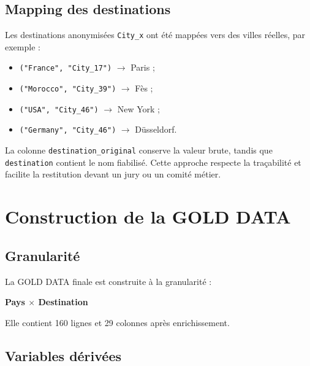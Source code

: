 \documentclass[11pt,a4paper]{report}
\begin{document}
\section{Mapping des destinations}

Les destinations anonymisées \texttt{City\_x} ont été mappées vers des villes réelles, par exemple :

\begin{itemize}[leftmargin=*]
    \item \texttt{("France", "City\_17")} $\rightarrow$ Paris ;
    \item \texttt{("Morocco", "City\_39")} $\rightarrow$ Fès ;
    \item \texttt{("USA", "City\_46")} $\rightarrow$ New York ;
    \item \texttt{("Germany", "City\_46")} $\rightarrow$ Düsseldorf.
\end{itemize}

La colonne \texttt{destination\_original} conserve la valeur brute, tandis que \texttt{destination} contient le nom fiabilisé. Cette approche respecte la traçabilité et facilite la restitution devant un jury ou un comité métier.

\chapter{Construction de la GOLD DATA}

\section{Granularité}

La GOLD DATA finale est construite à la granularité :

\begin{center}
\textbf{Pays $\times$ Destination}
\end{center}

Elle contient 160 lignes et 29 colonnes après enrichissement.

\section{Variables dérivées}
\end{document}

